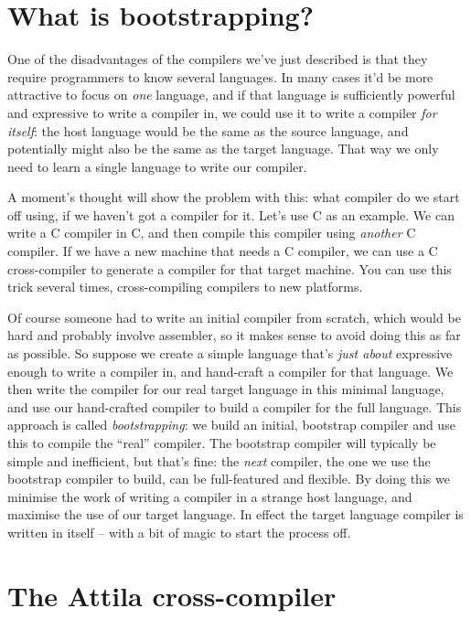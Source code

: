 \section{What is bootstrapping?}
\label{sec:what-is-bootstrapping}

One of the disadvantages of the compilers we've just described is that
they require programmers to know several languages. In many cases it'd
be more attractive to focus on \emph{one} language, and if that
language is sufficiently powerful and expressive to write a compiler in,
we could use it to write a compiler \emph{for itself}: the host
language would be the same as the source language, and potentially
might also be the same as the target language. That way we only need
to learn a single language to write our compiler.

A moment's thought will show the problem with this: what compiler do
we start off using, if we haven't got a compiler for it. Let's use C
as an example. We can write a C compiler in C, and then compile this
compiler using \emph{another} C compiler. If we have a new machine
that needs a C compiler, we can use a C cross-compiler to generate a
compiler for that target machine. You can use this trick several
times, cross-compiling compilers to new platforms.

Of course someone had to write an initial compiler from scratch, which
would be hard and probably involve assembler, so it makes sense to
avoid doing this as far as possible. So suppose we create a simple
language that's \emph{just about} expressive enough to write a
compiler in, and hand-craft a compiler for that language. We then
write the compiler for our real target language in this minimal
language, and use our hand-crafted compiler to build a compiler for
the full language. This approach is called \emph{bootstrapping}: we
build an initial, bootstrap compiler and use this to compile the
``real'' compiler. The bootstrap compiler will typically be simple and
inefficient, but that's fine: the \emph{next} compiler, the one we use
the bootstrap compiler to build, can be full-featured and flexible. By
doing this we minimise the work of writing a compiler in a strange
host language, and maximise the use of our target language. In effect
the target language compiler is written in itself -- with a bit of
magic to start the process off.


\section{The Attila cross-compiler}
\label{sec:attila-cross-compiler}

